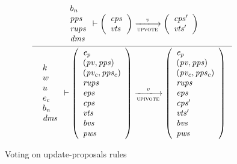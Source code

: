 \clearpage

\begin{figure}[htb]
  \begin{equation}
    \label{eq:rule:upi-vote}
    \inference
    {
      {
        \begin{array}{l}
          b_n\\
          \var{pps}\\
          \var{rups}\\
          \var{dms}
        \end{array}
      }
      \vdash
      {
        \left(
          \begin{array}{l}
            \var{cps}\\
            \var{vts}
          \end{array}
        \right)
      }
      \trans{upvote}{\var{v}}
      {
        \left(
          \begin{array}{l}
            \var{cps'}\\
            \var{vts'}
          \end{array}
        \right)
      }
    }
    {
      {
        \begin{array}{l}
          k\\
          w\\
          u\\
          e_c\\
          b_n\\
          \var{dms}
        \end{array}
      }
      \vdash
      {
        \left(
          \begin{array}{l}
            \var{e_p}\\
            (\var{pv}, \var{pps})\\
            (\var{pv_c}, \var{pps_c})\\
            \var{rups}\\
            \var{eps}\\
            \var{cps}\\
            \var{vts}\\
            \var{bvs}\\
            \var{pws}
          \end{array}
        \right)
      }
      \trans{upivote}{\var{v}}
      {
        \left(
          \begin{array}{l}
            \var{e_p}\\
            (\var{pv}, \var{pps})\\
            (\var{pv_c}, \var{pps_c})\\
            \var{rups}\\
            \var{eps}\\
            \var{cps'}\\
            \var{vts'}\\
            \var{bvs}\\
            \var{pws}
          \end{array}
        \right)
      }
    }
  \end{equation}
  \caption{Voting on update-proposals rules}
  \label{fig:rules:upi-vote}
\end{figure}

